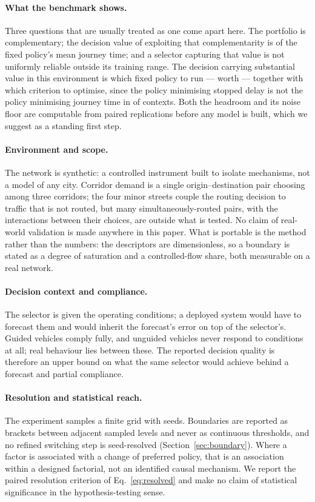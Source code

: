 \paragraph{What the benchmark shows.} Three questions that are usually treated
as one come apart here. The portfolio is complementary; the decision value of
exploiting that complementarity is \NumHeadroomPct{} of the fixed policy's mean
journey time; and a selector capturing that value is not uniformly reliable
outside its training range. The decision carrying substantial value in this
environment is which fixed policy to run --- worth \NumFixedPenPctAbsPOne{} ---
together with which criterion to optimise, since the policy minimising stopped
delay is not the policy minimising journey time in \NumBestCThreeDiffersPct{} of
contexts. Both the headroom and its noise floor are computable from paired
replications before any model is built, which we suggest as a standing first
step.

\paragraph{Environment and scope.} The network is synthetic: a controlled
instrument built to isolate mechanisms, not a model of any city. Corridor demand
is a single origin--destination pair choosing among three corridors; the four
minor streets couple the routing decision to traffic that is not routed, but
many simultaneously-routed pairs, with the interactions between their choices,
are outside what is tested. No claim of real-world validation is made anywhere
in this paper. What is portable is the method rather than the numbers: the
descriptors are dimensionless, so a boundary is stated as a degree of saturation
and a controlled-flow share, both measurable on a real network.

\paragraph{Decision context and compliance.} The selector is given the operating
conditions; a deployed system would have to forecast them and would inherit the
forecast's error on top of the selector's. Guided vehicles comply fully, and
unguided vehicles never respond to conditions at all; real behaviour lies
between these. The reported decision quality is therefore an upper bound on what
the same selector would achieve behind a forecast and partial compliance.

\paragraph{Resolution and statistical reach.} The experiment samples a finite
grid with \NumSeeds{} seeds. Boundaries are reported as brackets between
adjacent sampled levels and never as continuous thresholds, and no refined
switching step is seed-resolved (Section~\ref{sec:boundary}). Where a factor is
associated with a change of preferred policy, that is an association within a
designed factorial, not an identified causal mechanism. We report the paired
resolution criterion of Eq.~\ref{eq:resolved} and make no claim of statistical
significance in the hypothesis-testing sense.

